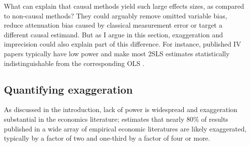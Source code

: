 \documentclass[usletter, 12pt]{article}
\begin{document}
		What can explain that causal methods yield such large effects sizes, as compared to non-causal methods? They could arguably remove omitted variable bias, reduce attenuation bias caused by classical measurement error or target a different causal estimand. But as I argue in this section, exaggeration and imprecision could also explain part of this difference. For instance, published IV papers typically have low power and make most 2SLS estimates statistically indistinguishable from the corresponding OLS \citep{young_consistency_2022}. %
				 
		 
	                \subsection{Quantifying exaggeration}
	                
	                	 	As discussed in the introduction, lack of power is widespread and exaggeration substantial in the economics literature; \cite{ioannidis_power_2017} estimates that nearly 80\% of results published in a wide array of empirical economic literatures are likely exaggerated, typically by a factor of two and one-third by a factor of four or more. %
			
\end{document}
